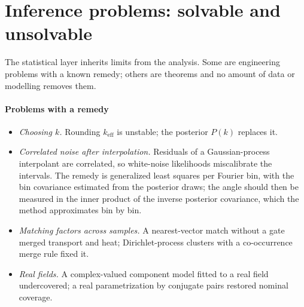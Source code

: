 \documentclass[11pt]{article}
\theoremstyle{plain}
\theoremstyle{definition}
\theoremstyle{remark}
\newcommand{\keff}{k_{\mathrm{eff}}}        %
\begin{document}


\section{Inference problems: solvable and unsolvable}\label{sec:limits}

The statistical layer inherits limits from the analysis. Some are engineering problems with a known
remedy; others are theorems and no amount of data or modelling removes them.

\paragraph{Problems with a remedy}
\begin{itemize}
  \item \emph{Choosing $k$.} Rounding $\keff$ is unstable; the posterior $P(k)$ replaces it.
  \item \emph{Correlated noise after interpolation.} Residuals of a Gaussian-process interpolant are
  correlated, so white-noise likelihoods miscalibrate the intervals. The remedy is generalized least squares
  per Fourier bin, with the bin covariance estimated from the posterior draws; the angle should then be
  measured in the inner product of the inverse posterior covariance, which the method approximates bin by bin.
  \item \emph{Matching factors across samples.} A nearest-vector match without a gate merged transport and
  heat; Dirichlet-process clusters with a co-occurrence merge rule fixed it.
  \item \emph{Real fields.} A complex-valued component model fitted to a real field undercovered; a real
  parametrization by conjugate pairs restored nominal coverage.
\end{itemize}
\end{document}
